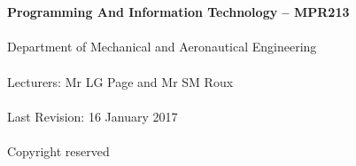 \begin{titlepage}
    \thispagestyle{empty}
    \\~\\[18cm]
    \large
    \textbf{Programming And Information Technology -- MPR213} \\~\\
    Department of Mechanical and Aeronautical Engineering \\~\\[0.5cm]
    \normalsize
    Lecturers: Mr LG Page and  Mr SM Roux \\~\\
    Last Revision: 16 January 2017 \\~\\[0.5em]
    \textcopyright \quad Copyright reserved \\~\\
\end{titlepage}
\restoregeometry

